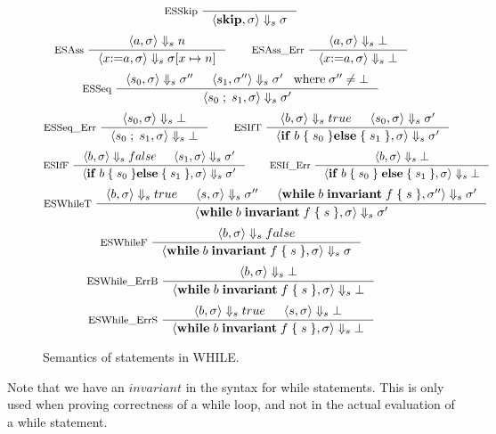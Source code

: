\begin{figure}[h!]
\begin{equation*}
\inference[ESSkip ]{}
{\judges{\mathbf{skip},\sigma}{\sigma}}
\end{equation*}
\begin{equation*}
\inference[ESAss ]{\judges{a,\sigma}{n}}
{\judges{x \mathbf{:=} a,\sigma}{\sigma[x \mapsto n]}}
\qquad
\inference[ESAss\_Err ]{\judges{a,\sigma}{\bot}}
{\judges{x \mathbf{:=} a,\sigma}{\bot}}
\end{equation*}
\begin{equation*}
\inference[ESSeq ]{\judges{s_0, \sigma}{\sigma''} & \judges{s_1, \sigma''}{\sigma'} \; \; \; \text{where} \; \sigma'' \neq \bot}
{\judges{s_0 \; ; \; s_1, \sigma}{\sigma'}}
\end{equation*}
\begin{equation*}
\inference[ESSeq\_Err ]{\judges{s_0, \sigma}{\bot}}
{\judges{s_0 \; ; \; s_1, \sigma}{\bot}}
\qquad
\inference[ESIfT ]{\judges{b, \sigma}{true} & \judges{s_0, \sigma}{\sigma'}}
{\judges{\mathbf{if} \; b \; \{ \; s_0 \; \} \mathbf{else} \; \{ \; s_1 \; \}, \sigma}{\sigma'}}
\end{equation*}
\begin{equation*}
\inference[ESIfF ]{\judges{b, \sigma}{false} & \judges{s_1, \sigma}{\sigma'}}
{\judges{\mathbf{if} \; b \; \{ \; s_0 \; \} \mathbf{else} \; \{ \; s_1 \; \}, \sigma}{\sigma'}}
\qquad
\inference[ESIf\_Err ]{\judges{b, \sigma}{\bot}}
{\judges{\mathbf{if} \; b \; \{ \; s_0 \; \} \; \mathbf{else} \; \{ \; s_1 \; \}, \sigma}{\bot}}
\end{equation*}
\begin{equation*}
\inference[ESWhileT ]{\judges{b, \sigma}{true} & \judges{s, \sigma}{\sigma''} & \judges{\mathbf{while} \; b \; \mathbf{invariant} \; f \; \{ \; s \; \}, \sigma''}{\sigma'}}
{\judges{\mathbf{while} \; b \; \mathbf{invariant} \; f \; \{ \; s \; \}, \sigma}{\sigma'}}
\end{equation*}
\begin{equation*}
\inference[ESWhileF ]{\judges{b, \sigma}{false}}
{\judges{\mathbf{while} \; b \; \mathbf{invariant} \; f \; \{ \; s \; \}, \sigma}{\sigma}}
\end{equation*}
\begin{equation*}
\inference[ESWhile\_ErrB ]{\judges{b, \sigma}{\bot}}
{\judges{\mathbf{while} \; b \; \mathbf{invariant} \; f \; \{ \; s \; \}, \sigma}{\bot}}
\end{equation*}
\begin{equation*}
\inference[ESWhile\_ErrS ]{\judges{b, \sigma}{true} & \judges{s, \sigma}{\bot}}
{\judges{\mathbf{while} \; b \; \mathbf{invariant} \; f \; \{ \; s \; \}, \sigma}{\bot}}
\end{equation*}
\caption{Semantics of statements in WHILE.}
\label{fig:stmtsemantics}
\end{figure}

Note that we have an $invariant$ in the syntax for while statements. This is only used when
proving correctness of a while loop, and not in the actual evaluation of a while statement.


